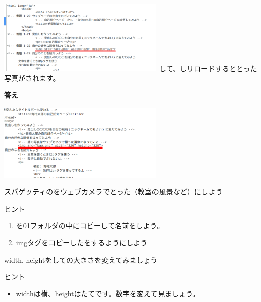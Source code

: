 \documentclass[a4paper,12pt]{jarticle}
\begin{document}
\begin{minipage}{\textwidth}
  \includegraphics[width=0.6\textwidth]{textbook-img171.png}
  \newline
  して、しリロードするととった写真がされます。
\end{minipage}

\flushleft
\textbf{答え}

\includegraphics[width=0.6\textwidth]{textbook-img172.png}



\theQuestion

スパゲッティのをウェブカメラでとった（教室の風景など）にしよう

ヒント

\begin{enumerate}
  \item
        を01フォルダの中にコピーして名前をしよう。
  \item
        imgタグをコピーしたをするようにしよう
\end{enumerate}
\theQuestion\label{Q:hasAnswer04-3}

width,
heightをしての大きさを変えてみましょう

ヒント

\begin{itemize}
  \item
        widthは横、heightはたてです。数字を変えて見ましょう。
\end{itemize}
\end{document}
